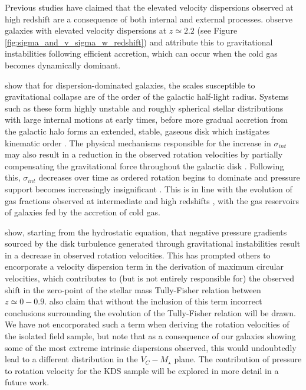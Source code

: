 \documentclass[fleqn,usenatbib]{mnras}
\begin{document}
Previous studies have claimed that the elevated velocity dispersions observed at high redshift are a consequence of both internal and external processes.
\cite{Law2009} observe galaxies with elevated velocity dispersions at $z\simeq2.2$ (see Figure \ref{fig:sigma_and_v_sigma_w_redshift}) and attribute this to gravitational instabilities following efficient accretion, which can occur when the cold gas becomes dynamically dominant.

\cite{Genzel2011} show that for dispersion-dominated galaxies, the scales susceptible to gravitational collapse are of the order of the galactic half-light radius. 
Systems such as these form highly unstable and roughly spherical stellar distributions with large internal motions at early times, before more gradual accretion from the galactic halo forms an extended, stable, gaseous disk which instigates kinematic order \citep{Law2009,Genzel2011}.
The physical mechanisms responsible for the increase in $\sigma_{int}$ may also result in a reduction in the observed rotation velocities by partially compensating the gravitational force throughout the galactic disk \citep[e.g.][]{Burkert2010,Wuyts2016b,Ubler2017,Genzel2017,Lang2017}.
Following this, $\sigma_{int}$ decreases over time as ordered rotation begins to dominate and pressure support becomes increasingly insignificant \citep[e.g.][]{Burkert2010,Ubler2017,Genzel2017,Lang2017}.
This is in line with the evolution of gas fractions observed at intermediate and high redshifts \citep[e.g.][]{Saintonge2013,Tacconi2013,Tacconi2017}, with the gas reservoirs of galaxies fed by the accretion of cold gas.

\noindent
\cite{Burkert2010} show, starting from the hydrostatic equation, that negative pressure gradients sourced by the disk turbulence generated through gravitational instabilities result in a decrease in observed rotation velocities. 
This has prompted others \citep[e.g.][]{Wuyts2016b,Ubler2017,Lang2017} to encorporate a velocity dispersion term in the derivation of maximum circular velocities, which contributes to (but is not entirely responsible for) the observed shift in the zero-point of the stellar mass Tully-Fisher relation between $z\simeq0-0.9$.
\cite{Ubler2017} also claim that without the inclusion of this term incorrect conclusions surrounding the evolution of the Tully-Fisher relation will be drawn.
We have not encorporated such a term when deriving the rotation velocities of the isolated field sample, but note that as a consequence of our galaxies showing some of the most extreme intrinsic dispersions observed, this would undoubtedly lead to a different distribution in the $V_{C}-M_{\star}$ plane.
The contribution of pressure to rotation velocity for the KDS sample will be explored in more detail in a future work. 
\\
\end{document}

